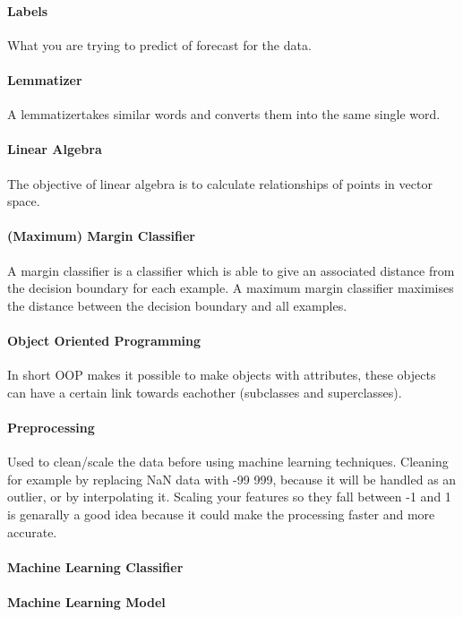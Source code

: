 \paragraph{Labels} 
What you are trying to predict of forecast for the data.

\paragraph{Lemmatizer}
A lemmatizertakes similar words and converts them into the same single word.

\paragraph{Linear Algebra} 
The objective of linear algebra is to calculate relationships of points in vector space. 

\paragraph{(Maximum) Margin Classifier}
A margin classifier is a classifier which is able to give an associated distance from the decision boundary for each example. A maximum margin classifier maximises the distance between the decision boundary and all examples.

\paragraph{Object Oriented Programming}
In short OOP makes it possible to make objects with attributes, these objects can have a certain link towards eachother (subclasses and superclasses).

\paragraph{Preprocessing} 
Used to clean/scale the data before using machine learning techniques. Cleaning for example by replacing NaN data with -99 999, because it will be handled as an outlier, or by interpolating it. Scaling your features so they fall between -1 and 1 is genarally a good idea because it could make the processing faster and more accurate.

\paragraph{Machine Learning Classifier} 

\paragraph{Machine Learning Model} 


